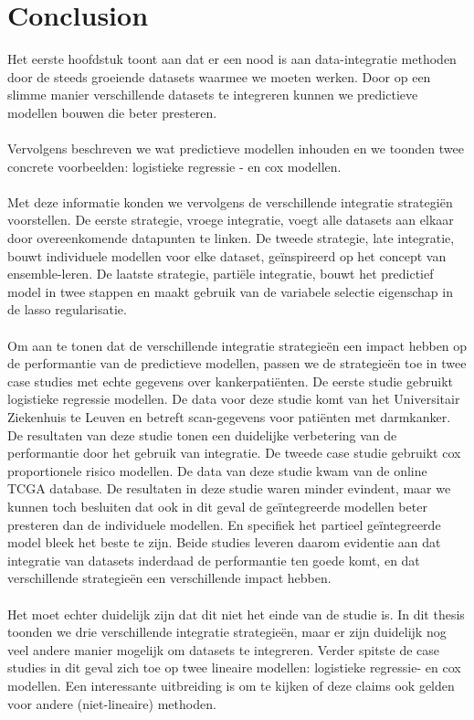 \chapter{Conclusion}
\label{cha:conclusion}
Het eerste hoofdstuk toont aan dat er een nood is aan data-integratie methoden door de steeds groeiende datasets waarmee we moeten werken. Door op een slimme manier verschillende datasets te integreren kunnen we predictieve modellen bouwen die beter presteren. \\ \\
Vervolgens beschreven we wat predictieve modellen inhouden en we toonden twee concrete voorbeelden: logistieke regressie - en cox modellen.  \\ \\
Met deze informatie konden we vervolgens de verschillende integratie strategi\"en voorstellen. De eerste strategie, vroege integratie, voegt alle datasets aan elkaar door overeenkomende datapunten te linken. De tweede strategie, late integratie, bouwt individuele modellen voor elke dataset, ge\"inspireerd op het concept van ensemble-leren. De laatste strategie, parti\"ele integratie, bouwt het predictief model in twee stappen en maakt gebruik van de variabele selectie eigenschap in de lasso regularisatie. \\ \\
Om aan te tonen dat de verschillende integratie strategie\"en een impact hebben op de performantie van de predictieve modellen, passen we de strategie\"en toe in twee case studies met echte gegevens over kankerpati\"enten. De eerste studie gebruikt logistieke regressie modellen. De data voor deze studie komt van het Universitair Ziekenhuis te Leuven en betreft scan-gegevens voor pati\"enten met darmkanker. De resultaten van deze studie tonen een duidelijke verbetering van de performantie door het gebruik van integratie. De tweede case studie gebruikt cox proportionele risico modellen. De data van deze studie kwam van de online TCGA database. De resultaten in deze studie waren minder evindent, maar we kunnen toch besluiten dat ook in dit geval de ge\"integreerde modellen beter presteren dan de individuele modellen. En specifiek het partieel ge\"integreerde model bleek het beste te zijn. Beide studies leveren daarom evidentie aan dat integratie van datasets inderdaad de performantie ten goede komt, en dat verschillende strategie\"en een verschillende impact hebben. \\ \\
Het moet echter duidelijk zijn dat dit niet het einde van de studie is. In dit thesis toonden we drie verschillende integratie strategie\"en, maar er zijn duidelijk nog veel andere manier mogelijk om datasets te integreren. Verder spitste de case studies in dit geval zich toe op twee lineaire modellen: logistieke regressie- en cox modellen. Een interessante uitbreiding is om te kijken of deze claims ook gelden voor andere (niet-lineaire) methoden. \\ \\
